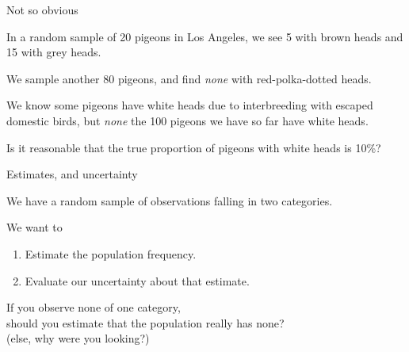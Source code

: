 \begin{frame}{Not so obvious}

    In a random sample of 20 pigeons in Los Angeles,
    we see 5 with brown heads and 15 with grey heads.\\

    \vspace{2em}

    \pause

    We sample another 80 pigeons, and find \emph{none} with red-polka-dotted heads.\\

    \vspace{2em}

    \pause

    We know some pigeons have white heads due to interbreeding with escaped domestic birds,
    but \emph{none} the 100 pigeons we have so far have white heads.\\

    \vspace{1em}
    \pause

    \alert{Is it reasonable} that the true proportion of pigeons with white heads is 10\%?


\end{frame}

\begin{frame}{Estimates, and uncertainty}

    We have a random sample of observations falling in two categories.

    \vspace{2em}

    We want to
    \begin{enumerate}
        \item Estimate the population frequency.
        \item Evaluate our uncertainty about that estimate.
    \end{enumerate}

    \vspace{2em}

    If you observe \alert{none} of one category, \\
        should you estimate that the population really has none? \\
            \hspace{3em}   {\small (else, why were you looking?)}

\end{frame}

